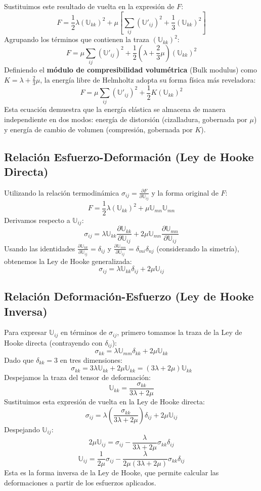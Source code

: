 Sustituimos este resultado de vuelta en la expresión de $F$:
$$ F = \frac{1}{2} \lambda (\mathbb{U}_{kk})^2 + \mu \left[ \sum_{ij} (\mathbb{U}'_{ij})^2 + \frac{1}{3} (\mathbb{U}_{kk})^2 \right] $$
Agrupando los términos que contienen la traza $(\mathbb{U}_{kk})^2$:
$$ F = \mu \sum_{ij} (\mathbb{U}'_{ij})^2 + \frac{1}{2} \left( \lambda + \frac{2}{3} \mu \right) (\mathbb{U}_{kk})^2 $$
Definiendo el \textbf{módulo de compresibilidad volumétrica} (Bulk modulus) como $K = \lambda + \frac{2}{3}\mu$, la energía libre de Helmholtz adopta su forma física más reveladora:
$$ F = \mu \sum_{ij} (\mathbb{U}'_{ij})^2 + \frac{1}{2} K (\mathbb{U}_{kk})^2 $$
Esta ecuación demuestra que la energía elástica se almacena de manera independiente en dos modos: energía de distorsión (cizalladura, gobernada por $\mu$) y energía de cambio de volumen (compresión, gobernada por $K$).

\subsection{Relación Esfuerzo-Deformación (Ley de Hooke Directa)}

Utilizando la relación termodinámica $\sigma_{ij} = \frac{\partial F}{\partial \mathbb{U}_{ij}}$ y la forma original de $F$:
$$ F = \frac{1}{2} \lambda (\mathbb{U}_{kk})^2 + \mu \mathbb{U}_{mn} \mathbb{U}_{mn} $$
Derivamos respecto a $\mathbb{U}_{ij}$:
$$ \sigma_{ij} = \lambda \mathbb{U}_{kk} \frac{\partial \mathbb{U}_{kk}}{\partial \mathbb{U}_{ij}} + 2\mu \mathbb{U}_{mn} \frac{\partial \mathbb{U}_{mn}}{\partial \mathbb{U}_{ij}} $$
Usando las identidades $\frac{\partial \mathbb{U}_{kk}}{\partial \mathbb{U}_{ij}} = \delta_{ij}$ y $\frac{\partial \mathbb{U}_{mn}}{\partial \mathbb{U}_{ij}} = \delta_{mi} \delta_{nj}$ (considerando la simetría), obtenemos la Ley de Hooke generalizada:
$$ \sigma_{ij} = \lambda \mathbb{U}_{kk} \delta_{ij} + 2\mu \mathbb{U}_{ij} $$

\subsection{Relación Deformación-Esfuerzo (Ley de Hooke Inversa)}

Para expresar $\mathbb{U}_{ij}$ en términos de $\sigma_{ij}$, primero tomamos la traza de la Ley de Hooke directa (contrayendo con $\delta_{ij}$):
$$ \sigma_{kk} = \lambda \mathbb{U}_{mm} \delta_{kk} + 2\mu \mathbb{U}_{kk} $$
Dado que $\delta_{kk} = 3$ en tres dimensiones:
$$ \sigma_{kk} = 3\lambda \mathbb{U}_{kk} + 2\mu \mathbb{U}_{kk} = (3\lambda + 2\mu) \mathbb{U}_{kk} $$
Despejamos la traza del tensor de deformación:
$$ \mathbb{U}_{kk} = \frac{\sigma_{kk}}{3\lambda + 2\mu} $$
Sustituimos esta expresión de vuelta en la Ley de Hooke directa:
$$ \sigma_{ij} = \lambda \left( \frac{\sigma_{kk}}{3\lambda + 2\mu} \right) \delta_{ij} + 2\mu \mathbb{U}_{ij} $$
Despejando $\mathbb{U}_{ij}$:
$$ 2\mu \mathbb{U}_{ij} = \sigma_{ij} - \frac{\lambda}{3\lambda + 2\mu} \sigma_{kk} \delta_{ij} $$
$$ \mathbb{U}_{ij} = \frac{1}{2\mu} \sigma_{ij} - \frac{\lambda}{2\mu(3\lambda + 2\mu)} \sigma_{kk} \delta_{ij} $$
Esta es la forma inversa de la Ley de Hooke, que permite calcular las deformaciones a partir de los esfuerzos aplicados.
